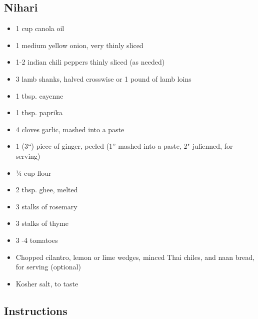\documentclass[]{article}
\providecommand{\tightlist}{%
  \setlength{\itemsep}{0pt}\setlength{\parskip}{0pt}}
\begin{document}
\hypertarget{nihari}{%
\subsection{Nihari}\label{nihari}}

\begin{itemize}
\tightlist
\item
  1 cup canola oil
\item
  1 medium yellow onion, very thinly sliced
\item
  1-2 indian chili peppers thinly sliced (as needed)
\item
  3 lamb shanks, halved crosswise or 1 pound of lamb loins
\item
  1 tbsp. cayenne
\item
  1 tbsp. paprika
\item
  4 cloves garlic, mashed into a paste
\item
  1 (3``) piece of ginger, peeled (1'' mashed into a paste, 2" julienned, for serving)
\item
  1⁄4 cup flour
\item
  2 tbsp. ghee, melted
\item
  3 stalks of rosemary
\item
  3 stalks of thyme
\item
  3 -4 tomatoes
\item
  Chopped cilantro, lemon or lime wedges, minced Thai chiles, and naan bread, for serving (optional)
\item
  Kosher salt, to taste
\end{itemize}

\hypertarget{instructions}{%
\subsection{Instructions}\label{instructions}}
\end{document}
